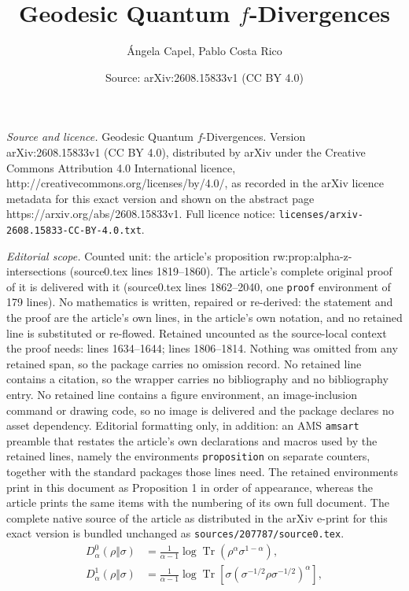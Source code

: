 \documentclass[10pt,a4paper]{amsart}
\title{Geodesic Quantum $f$-Divergences}
\author{\'Angela Capel, Pablo Costa Rico}
\date{Source: arXiv:2608.15833v1 (CC BY 4.0)}
\begin{document}
\maketitle

\noindent\emph{Source and licence.} Geodesic Quantum $f$-Divergences. Version arXiv:2608.15833v1 (CC BY 4.0), distributed by arXiv under the Creative Commons Attribution 4.0 International licence, http://creativecommons.org/licenses/by/4.0/, as recorded in the arXiv licence metadata for this exact version and shown on the abstract page https://arxiv.org/abs/2608.15833v1. Full licence notice: \texttt{licenses/arxiv-2608.15833-CC-BY-4.0.txt}.\par\smallskip

\noindent\textit{Editorial scope.} Counted unit: the article's proposition rw:prop:alpha-z-intersections (source0.tex lines 1819--1860). The article's complete original proof of it is delivered with it (source0.tex lines 1862--2040, one \texttt{proof} environment of 179 lines). No mathematics is written, repaired or re-derived: the statement and the proof are the article's own lines, in the article's own notation, and no retained line is substituted or re-flowed.  Retained uncounted as the source-local context the proof needs: lines 1634--1644; lines 1806--1814.  Nothing was omitted from any retained span, so the package carries no omission record.  No retained line contains a citation, so the wrapper carries no bibliography and no bibliography entry.  No retained line contains a figure environment, an image-inclusion command or drawing code, so no image is delivered and the package declares no asset dependency.  Editorial formatting only, in addition: an AMS \texttt{amsart} preamble that restates the article's own declarations and macros used by the retained lines, namely the environments \texttt{proposition} on separate counters, together with the standard packages those lines need.  The retained environments print in this document as Proposition 1 in order of appearance, whereas the article prints the same items with the numbering of its own full document.  The complete native source of the article as distributed in the arXiv e-print for this exact version is bundled unchanged as \texttt{sources/207787/source0.tex}.
\begin{align}
 D_\alpha^0(\rho\Vert\sigma)
 &=\frac{1}{\alpha-1}
   \log\operatorname{Tr}(\rho^\alpha\sigma^{1-\alpha}),
 \label{rw:eq:petz-renyi-endpoint}\\
 D_\alpha^1(\rho\Vert\sigma)
 &=\frac{1}{\alpha-1}
   \log\operatorname{Tr}\!\left[
    \sigma(\sigma^{-1/2}\rho\sigma^{-1/2})^\alpha\right],
 \label{rw:eq:geometric-renyi-endpoint}
\end{align}
\end{document}
